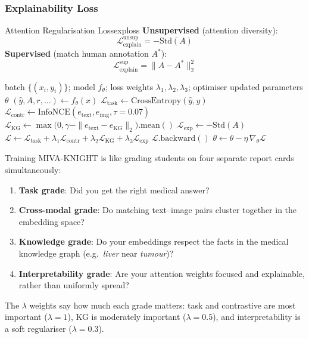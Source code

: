 \documentclass[12pt,a4paper]{article}
\newenvironment{plainbox}[1]{%
  \begin{tcolorbox}[myplain,title={#1}]
}{%
  \end{tcolorbox}
}
\begin{document}
\subsubsection{Explainability Loss}

\begin{definition}{Attention Regularisation Loss}{exploss}
\textbf{Unsupervised} (attention diversity):
\[
  \mathcal{L}_\text{explain}^{\text{unsup}} = -\text{Std}(A)
\]
\textbf{Supervised} (match human annotation $A^*$):
\[
  \mathcal{L}_\text{explain}^{\text{sup}} = \|A - A^*\|_2^2
\]
\end{definition}

\begin{algorithm}[H]
\caption{MIVA-KNIGHT Multi-Objective Training Step}
\label{alg:train}
\begin{algorithmic}[1]
\Require batch $\{(x_i, y_i)\}$; model $f_\theta$; loss weights $\lambda_1, \lambda_2, \lambda_3$; optimiser
\Ensure updated parameters $\theta$
\State $(\hat{y}, A, r, \ldots) \leftarrow f_\theta(x)$  
\State $\mathcal{L}_\text{task} \leftarrow \text{CrossEntropy}(\hat{y}, y)$
\State $\mathcal{L}_\text{contr} \leftarrow \text{InfoNCE}(e_\text{text}, e_\text{img}, \tau=0.07)$
\State $\mathcal{L}_\text{KG} \leftarrow \max\!\bigl(0, \gamma - \|e_\text{text} - e_\text{KG}\|_2\bigr).\text{mean}()$
\State $\mathcal{L}_\text{exp} \leftarrow -\text{Std}(A)$
\State $\mathcal{L} \leftarrow \mathcal{L}_\text{task}
       + \lambda_1\mathcal{L}_\text{contr}
       + \lambda_2\mathcal{L}_\text{KG}
       + \lambda_3\mathcal{L}_\text{exp}$
\State $\mathcal{L}.\text{backward}()$  
\State $\theta \leftarrow \theta - \eta\,\nabla_\theta\mathcal{L}$  
\end{algorithmic}
\end{algorithm}

\begin{plainbox}{In Plain English}
Training MIVA-KNIGHT is like grading students on four separate report cards
simultaneously:
\begin{enumerate}
  \item \textbf{Task grade}: Did you get the right medical answer?
  \item \textbf{Cross-modal grade}: Do matching text--image pairs cluster together in
        the embedding space?
  \item \textbf{Knowledge grade}: Do your embeddings respect the facts in the medical
        knowledge graph (e.g.\ \emph{liver} near \emph{tumour})?
  \item \textbf{Interpretability grade}: Are your attention weights focused and
        explainable, rather than uniformly spread?
\end{enumerate}
The $\lambda$ weights say how much each grade matters: task and contrastive are most
important ($\lambda=1$), KG is moderately important ($\lambda=0.5$), and
interpretability is a soft regulariser ($\lambda=0.3$).
\end{plainbox}
\end{document}
